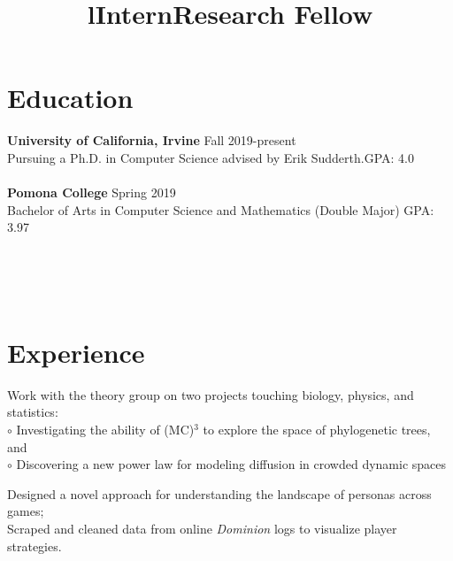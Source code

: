 \documentclass[margin]{res}
\begin{document}
\begin{resume}

\section{Education}
\textbf{University of California, Irvine} \hfill Fall 2019-present\\
Pursuing a Ph.D. in Computer Science advised by Erik Sudderth.\hfill GPA: 4.0\\ \\
\textbf{Pomona College} \hfill Spring 2019\\
Bachelor of Arts in Computer Science and Mathematics (Double Major) \hfill 
GPA: 3.97



\begin{format}
\title{l}\\
\\
\body\\
\end{format}
\section{Experience}

\title{\textbf{Intern}}
\begin{position}
Work with the theory group on two projects touching biology, physics, and statistics:\\
$\circ$ Investigating the ability of (MC)$^3$ to explore the space of phylogenetic trees, and \\
$\circ$ Discovering a new power law for modeling diffusion in crowded dynamic spaces
\end{position}


\title{\textbf{Research Fellow}}
\begin{position}
Designed a novel approach for understanding the landscape of personas across games;\\
Scraped and cleaned data from online \emph{Dominion} logs to visualize player strategies.
\end{position}


\end{resume}
\end{document}

